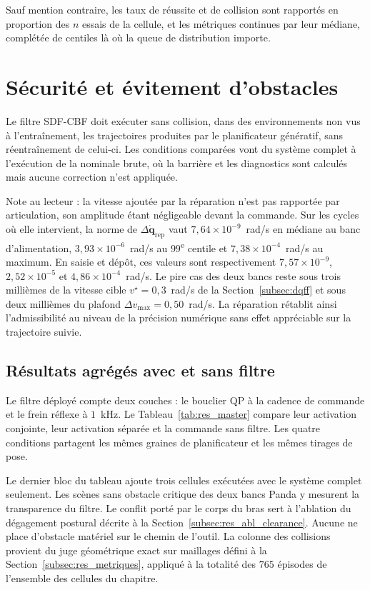 Sauf mention contraire, les taux de réussite et de collision sont rapportés en proportion des $n$ essais de la cellule, et les métriques continues par leur médiane, complétée de centiles là où la queue de distribution importe.

\section{Sécurité et évitement d'obstacles}\label{sec:res_securite}
Le filtre \ac{SDF}-\ac{CBF} doit exécuter sans collision, dans des environnements non vus à l'entraînement, les trajectoires produites par le planificateur génératif, sans réentraînement de celui-ci. Les conditions comparées vont du système complet à l'exécution de la nominale brute, où la barrière et les diagnostics sont calculés mais aucune correction n'est appliquée.

Note au lecteur : la vitesse ajoutée par la réparation n'est pas rapportée par articulation, son amplitude étant négligeable devant la commande. Sur les cycles où elle intervient, la norme de $\Delta\dot{\mathbf{q}}_{\mathrm{rep}}$ vaut $7{,}64\times10^{-9}$~rad/s en médiane au banc d'alimentation, $3{,}93\times10^{-6}$~rad/s au $99$\textsuperscript{e} centile et $7{,}38\times10^{-4}$~rad/s au maximum. En saisie et dépôt, ces valeurs sont respectivement $7{,}57\times10^{-9}$, $2{,}52\times10^{-5}$ et $4{,}86\times10^{-4}$~rad/s. Le pire cas des deux bancs reste sous trois millièmes de la vitesse cible $v^{\star}=0{,}3$~rad/s de la Section~\ref{subsec:dqff} et sous deux millièmes du plafond $\Delta v_{\max}=0{,}50$~rad/s. La réparation rétablit ainsi l'admissibilité au niveau de la précision numérique sans effet appréciable sur la trajectoire suivie.

\subsection{Résultats agrégés avec et sans filtre}\label{subsec:res_ab}
Le filtre déployé compte deux couches : le bouclier \ac{QP} à la cadence de commande et le frein réflexe à $1$~kHz. Le Tableau~\ref{tab:res_master} compare leur activation conjointe, leur activation séparée et la commande sans filtre. Les quatre conditions partagent les mêmes graines de planificateur et les mêmes tirages de pose.

Le dernier bloc du tableau ajoute trois cellules exécutées avec le système complet seulement. Les scènes sans obstacle critique des deux bancs Panda y mesurent la transparence du filtre. Le conflit porté par le corps du bras sert à l'ablation du dégagement postural décrite à la Section~\ref{subsec:res_abl_clearance}.
Aucune ne place d'obstacle matériel sur le chemin de l'outil. La colonne des collisions provient du juge géométrique exact sur maillages défini à la Section~\ref{subsec:res_metriques}, appliqué à la totalité des $765$ épisodes de l'ensemble des cellules du chapitre.

